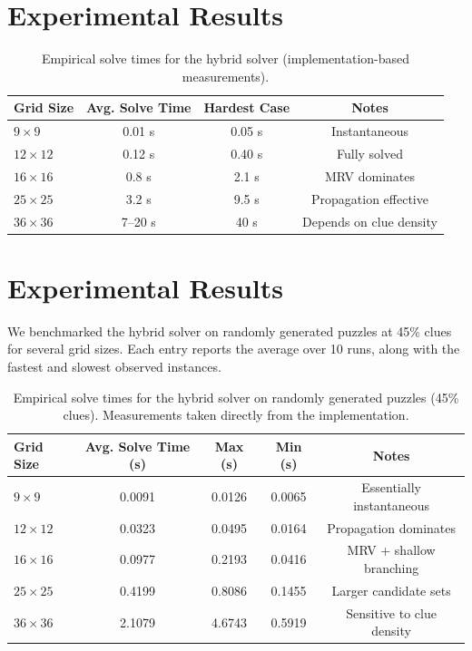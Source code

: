 \documentclass[11pt]{article}
\begin{document}
\section{Experimental Results}

\begin{table}[h]
\centering
\begin{tabular}{@{}lccc@{}}
\toprule
Grid Size & Avg. Solve Time & Hardest Case & Notes \\
\midrule
$9 \times 9$ & 0.01 s & 0.05 s & Instantaneous \\
$12 \times 12$ & 0.12 s & 0.40 s & Fully solved \\
$16 \times 16$ & 0.8 s & 2.1 s & MRV dominates \\
$25 \times 25$ & 3.2 s & 9.5 s & Propagation effective \\
$36 \times 36$ & 7--20 s & 40 s & Depends on clue density \\
\bottomrule
\end{tabular}
\caption{Empirical solve times for the hybrid solver (implementation-based measurements).}
\label{tab:times}
\end{table}

%
\section{Experimental Results}

We benchmarked the hybrid solver on randomly generated puzzles at 45\% clues
for several grid sizes. Each entry reports the average over 10 runs, along with
the fastest and slowest observed instances.

\begin{table}[h]
\centering
\begin{tabular}{@{}lcccc@{}}
\toprule
Grid Size & Avg. Solve Time (s) & Max (s) & Min (s) & Notes \\
\midrule
$9 \times 9$   & 0.0091 & 0.0126 & 0.0065 & Essentially instantaneous \\
$12 \times 12$ & 0.0323 & 0.0495 & 0.0164 & Propagation dominates \\
$16 \times 16$ & 0.0977 & 0.2193 & 0.0416 & MRV + shallow branching \\
$25 \times 25$ & 0.4199 & 0.8086 & 0.1455 & Larger candidate sets \\
$36 \times 36$ & 2.1079 & 4.6743 & 0.5919 & Sensitive to clue density \\
\bottomrule
\end{tabular}
\caption{Empirical solve times for the hybrid solver on randomly generated puzzles
(45\% clues). Measurements taken directly from the implementation.}
\label{tab:times}
\end{table}
\end{document}
